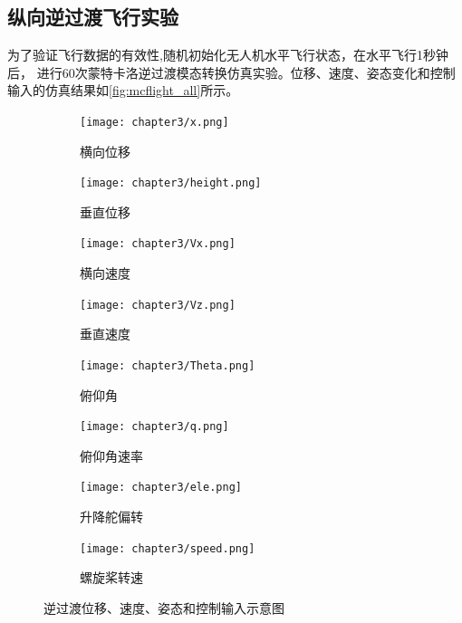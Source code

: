 \subsection{纵向逆过渡飞行实验}
为了验证飞行数据的有效性,随机初始化无人机水平飞行状态，在水平飞行1秒钟后，
进行60次蒙特卡洛逆过渡模态转换仿真实验。位移、速度、姿态变化和控制输入的仿真结果如\autoref{fig:mcflight_all}所示。
\begin{figure}[H]
    \centering
    \begin{subfigure}{.46\textwidth}
        \centering
        \texttt{[image: chapter3/x.png]}
        \caption{横向位移}
        \label{fig:sub1}
    \end{subfigure}%
    \begin{subfigure}{.46\textwidth}
        \centering
        \texttt{[image: chapter3/height.png]}
        \caption{垂直位移}
        \label{fig:sub2}
    \end{subfigure}
    \begin{subfigure}{.46\textwidth}
        \centering
        \texttt{[image: chapter3/Vx.png]}
        \caption{横向速度}
        \label{fig:sub3}
    \end{subfigure}%
    \begin{subfigure}{.46\textwidth}
        \centering
        \texttt{[image: chapter3/Vz.png]}
        \caption{垂直速度}
        \label{fig:sub4}
    \end{subfigure}
    \begin{subfigure}{.46\textwidth}
        \centering
        \texttt{[image: chapter3/Theta.png]}
        \caption{俯仰角}
        \label{fig:sub5}
    \end{subfigure}%
    \begin{subfigure}{.46\textwidth}
        \centering
        \texttt{[image: chapter3/q.png]}
        \caption{俯仰角速率}
        \label{fig:sub6}
    \end{subfigure}
    \begin{subfigure}{.46\textwidth}
        \centering
        \texttt{[image: chapter3/ele.png]}
        \caption{升降舵偏转}
        \label{fig:sub7}
    \end{subfigure}%
    \begin{subfigure}{.46\textwidth}
        \centering
        \texttt{[image: chapter3/speed.png]}
        \caption{螺旋桨转速}
        \label{fig:sub8}
    \end{subfigure}
    \caption{逆过渡位移、速度、姿态和控制输入示意图}
    \label{fig:mcflight_all}
\end{figure}

